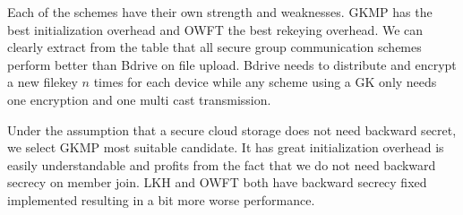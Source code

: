 Each of the schemes have their own strength and weaknesses. \ac{GKMP} has the best initialization overhead and \ac{OWFT} the best rekeying overhead. We can clearly extract from the table that all secure group communication schemes perform better than Bdrive on file upload. Bdrive needs to distribute and encrypt a new filekey $n$ times for each device while any scheme using a \ac{GK} only needs one encryption and one multi cast transmission. 

Under the assumption that a secure cloud storage does not need backward secret, we select \ac{GKMP} most suitable candidate. It has great initialization overhead is easily understandable and profits from the fact that we do not need backward secrecy on member join. \ac{LKH} and \ac{OWFT} both have backward secrecy fixed implemented resulting in a bit more worse performance. 